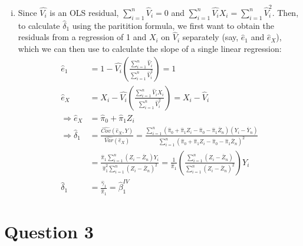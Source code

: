 \documentclass{article}
\newcommand{\oly}[1]{\overline{Y}_{#1}}
\newcommand{\olz}[1]{\overline{Z}_{#1}}
\newcommand{\sumn}{\sum_{i=1}^{n}}
\newcommand{\bhat}{\hat{\beta}}
\newcommand{\biv}{\bhat^{IV}}
\begin{document}
\begin{enumerate}[(i)]
	\item Since $\hat{V_i}$ is an OLS residual, ${\sumn\hat{V}_i=0}$ and ${\sumn\hat{V_i}X_i = \sumn\hat{V}_i^2}$. Then, to calculate $\hat{\delta}_1$ using the paritition formula, we first want to obtain the residuals from a regression of 1 and $X_i$ on $\hat{V}_i$ separately (say, $\hat{e}_1$ and $\hat{e}_X$), which we can then use to calculate the slope of a single linear regression:
		\begin{align*}
			\hat{e}_1		&= 1 - \hat{V_i}\left(\frac{\sumn\hat{V}_i}{\sumn\hat{V}_i^2}\right) = 1					\\
			\hat{e}_X 		&= X_i - \hat{V_i}\left(\frac{\sumn\hat{V}_iX_i}{\sumn\hat{V}_i^2}\right) = X_i - \hat{V}_i	\\
\Rightarrow \hat{e}_X		&= \hat{\pi}_0 + \hat{\pi}_1Z_i																\\
\Rightarrow \hat{\delta}_1	&= \frac{\widehat{Cov}(\hat{e}_X,Y)}{\widehat{Var}(\hat{e}_X)}								
							= \frac{\sumn(\hat{\pi}_0 + \hat{\pi}_1Z_i - \hat{\pi}_0 - \hat{\pi}_1\olz{n})(Y_i-\oly{n})}{\sumn(\hat{\pi}_0 + \hat{\pi}_1Z_i - \hat{\pi}_0 - \hat{\pi}_1\olz{n})^2}																		\\
							&= \frac{\hat{\pi}_1\sumn(Z_i-\olz{n})Y_i}{\hat{\pi}_1^2\sumn(Z_i-\olz{n})^2} 
							= \frac{1}{\hat{\pi}_1}\left(\frac{\sumn(Z_i-\olz{n})}{\sumn(Z_i-\olz{n})^2}\right)Y_i		\\
			\hat{\delta}_1	&= \frac{\hat{\gamma}_1}{\hat{\pi}_1} = \biv_1
		\end{align*}
	
\end{enumerate}


\section*{Question 3}
\end{document}
